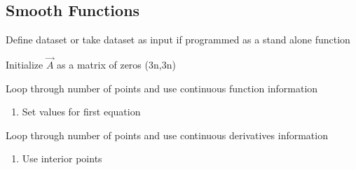 \subsection{Smooth Functions}


\begin{pseudocode}
\item Define dataset or take dataset as input if programmed as a stand alone function
\item Initialize $\vec{A}$ as a matrix of zeros (3n,3n)
\item Loop through number of points and use continuous function information

\begin{enumerate}
\item Set values for first equation
\end{enumerate}

\item Loop through number of points and use continuous derivatives information
\begin{enumerate}
\item Use interior points
\end{enumerate}

\end{pseudocode}